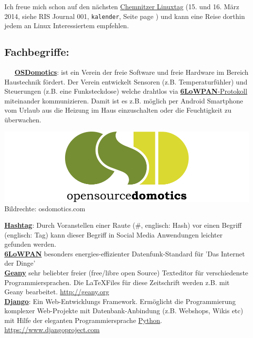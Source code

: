 Ich freue mich schon auf den nächsten \href{http://chemnitzer.linux-tage.de/2014/en/info/}{Chemnitzer Linuxtag} (15. und 16. März 2014, siehe RIS Journal 001, \texttt{kalender}, Seite page \pageref{kalender}) und kann eine Reise dorthin jedem an Linux Interessiertem empfehlen.

\subsection*{Fachbegriffe:}
~~~\href{http://www.osdomotics.com/}{\textbf{OSDomotics}}: ist ein Verein der freie Software und freie Hardware im Bereich Haustechnik fördert. Der Verein entwickelt Sensoren (z.B. Temperaturfühler) und Steuerungen (z.B. eine Funksteckdose) welche drahtlos via \href{http://de.wikipedia.org/wiki/6LoWPAN}{\textbf{6LoWPAN}-Protokoll} miteinander kommunizieren. Damit ist es z.B. möglich per Android Smartphone vom Urlaub aus die Heizung im Haus einzuschalten oder die Feuchtigkeit zu überwachen.
\begin{center}
\includegraphics[width=\linewidth]{chemnitz/chemnitz_osd_domotics_logo-2881.png}
\footnotesize{Bildrechte: osdomotics.com}
\end{center}

\href{http://de.wikipedia.org/wiki/Hashtag}{\textbf{Hashtag}}: Durch Voranstellen einer Raute (\#, englisch: Hash) vor einen Begriff (englisch: Tag) kann dieser Begriff in Social Media Anwendungen leichter gefunden werden. \\

\href{http://de.wikipedia.org/wiki/6LoWPAN}{\textbf{6LoWPAN}} besonders energies-effizienter  Datenfunk-Standard für 'Das Internet der Dinge'\\

\href{http://geany.org/}{\textbf{Geany}} sehr beliebter freier (free/libre open Source) Texteditor für verschiedenste Programmiersprachen. Die \LaTeX Files für diese Zeitschrift werden z.B. mit Geany bearbeitet. \url{http://geany.org} \\

\href{https://www.djangoproject.com/}{\textbf{Django}}: Ein Web-Entwicklungs Framework. Ermöglicht die Programmierung komplexer Web-Projekte mit Datenbank-Anbindung (z.B. Webshops, Wikis etc) mit Hilfe der eleganten Programmiersprache \href{http://python.org}{Python}. \url{https://www.djangoproject.com} \\

